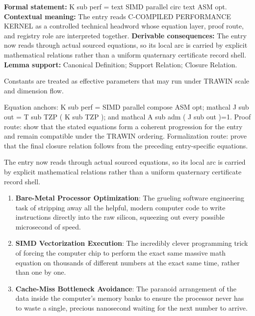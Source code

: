 \begingroup\footnotesize\setlength{\emergencystretch}{3em}\sloppy
\textbf{Formal statement:} K sub perf = text SIMD parallel circ text ASM opt. \textbf{Contextual meaning:} The entry reads C-COMPILED PERFORMANCE KERNEL as a controlled technical headword whose equation layer, proof route, and registry role are interpreted together. \textbf{Derivable consequences:} The entry now reads through actual sourced equations, so its local arc is carried by explicit mathematical relations rather than a uniform quaternary certificate record shell. \textbf{Lemma support:} Canonical Definition; Support Relation; Closure Relation.\par
\endgroup

Constants are treated as effective parameters that may run under TRAWIN scale and dimension flow.

Equation anchors: K sub perf = SIMD parallel compose ASM opt; mathcal J sub out = T sub TZP ( K sub TZP ); and mathcal A sub adm ( J sub out )=1. Proof route: show that the stated equations form a coherent progression for the entry and remain compatible under the TRAWIN ordering. Formalization route: prove that the final closure relation follows from the preceding entry-specific equations.

The entry now reads through actual sourced equations, so its local arc is carried by explicit mathematical relations rather than a uniform quaternary certificate record shell.
\endgroup

\begin{enumerate}[leftmargin=1.6em,itemsep=6pt,topsep=4pt]
\item \textbf{Bare-Metal Processor Optimization}: The grueling software engineering task of stripping away all the helpful, modern computer code to write instructions directly into the raw silicon, squeezing out every possible microsecond of speed.
\item \textbf{SIMD Vectorization Execution}: The incredibly clever programming trick of forcing the computer chip to perform the exact same massive math equation on thousands of different numbers at the exact same time, rather than one by one.
\item \textbf{Cache-Miss Bottleneck Avoidance}: The paranoid arrangement of the data inside the computer's memory banks to ensure the processor never has to waste a single, precious nanosecond waiting for the next number to arrive.
\end{enumerate}

